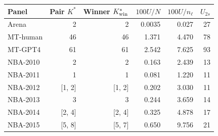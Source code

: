 \begin{tabular}{lrrrrr}
\toprule
Panel & Pair $K^*$ & Winner $K^*_{\rm win}$ & $100U/N$ & $100U/n_\ell$ & $U_{2s}$ \\
\midrule
Arena & 2 & 2 & 0.0035 & 0.027 & 27 \\
MT-human & 46 & 46 & 1.371 & 4.470 & 78 \\
MT-GPT4 & 61 & 61 & 2.542 & 7.625 & 93 \\
NBA-2010 & 2 & 2 & 0.163 & 2.439 & 13 \\
NBA-2011 & 1 & 1 & 0.081 & 1.220 & 11 \\
NBA-2012 & [1, 2] & [1, 2] & 0.202 & 3.030 & 11 \\
NBA-2013 & 3 & 3 & 0.244 & 3.659 & 14 \\
NBA-2014 & [2, 4] & [2, 4] & 0.325 & 4.878 & 17 \\
NBA-2015 & [5, 8] & [5, 7] & 0.650 & 9.756 & 21 \\
\bottomrule
\end{tabular}
